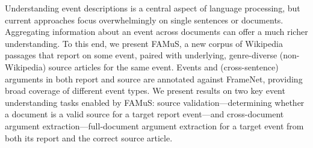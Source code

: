 Understanding event descriptions is a central aspect of language processing, but current approaches focus overwhelmingly on single sentences or documents. Aggregating information about an event across documents can offer a much richer understanding. To this end, we present FAMuS, a new corpus of Wikipedia passages that report on some event, paired with underlying, genre-diverse (non-Wikipedia) source articles for the same event. Events and (cross-sentence) arguments in both report and source are annotated against FrameNet, providing broad coverage of different event types. We present results on two key event understanding tasks enabled by FAMuS: source validation---determining whether a document is a valid source for a target report event---and cross-document argument extraction---full-document argument extraction for a target event from both its report and the correct source article.